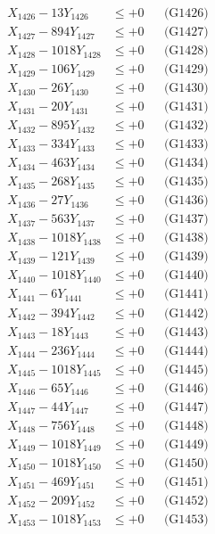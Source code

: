 \documentclass[a4paper,10pt]{article}
\begin{document}
{\begin{align}
X_{1426} - 13Y_{1426} &\leq +0 && \text{(G1426)} \\
X_{1427} - 894Y_{1427} &\leq +0 && \text{(G1427)} \\
X_{1428} - 1018Y_{1428} &\leq +0 && \text{(G1428)} \\
X_{1429} - 106Y_{1429} &\leq +0 && \text{(G1429)} \\
X_{1430} - 26Y_{1430} &\leq +0 && \text{(G1430)} \\
\allowbreak
X_{1431} - 20Y_{1431} &\leq +0 && \text{(G1431)} \\
X_{1432} - 895Y_{1432} &\leq +0 && \text{(G1432)} \\
X_{1433} - 334Y_{1433} &\leq +0 && \text{(G1433)} \\
X_{1434} - 463Y_{1434} &\leq +0 && \text{(G1434)} \\
X_{1435} - 268Y_{1435} &\leq +0 && \text{(G1435)} \\
X_{1436} - 27Y_{1436} &\leq +0 && \text{(G1436)} \\
X_{1437} - 563Y_{1437} &\leq +0 && \text{(G1437)} \\
X_{1438} - 1018Y_{1438} &\leq +0 && \text{(G1438)} \\
X_{1439} - 121Y_{1439} &\leq +0 && \text{(G1439)} \\
X_{1440} - 1018Y_{1440} &\leq +0 && \text{(G1440)} \\
\allowbreak
X_{1441} - 6Y_{1441} &\leq +0 && \text{(G1441)} \\
X_{1442} - 394Y_{1442} &\leq +0 && \text{(G1442)} \\
X_{1443} - 18Y_{1443} &\leq +0 && \text{(G1443)} \\
X_{1444} - 236Y_{1444} &\leq +0 && \text{(G1444)} \\
X_{1445} - 1018Y_{1445} &\leq +0 && \text{(G1445)} \\
X_{1446} - 65Y_{1446} &\leq +0 && \text{(G1446)} \\
X_{1447} - 44Y_{1447} &\leq +0 && \text{(G1447)} \\
X_{1448} - 756Y_{1448} &\leq +0 && \text{(G1448)} \\
X_{1449} - 1018Y_{1449} &\leq +0 && \text{(G1449)} \\
X_{1450} - 1018Y_{1450} &\leq +0 && \text{(G1450)} \\
\allowbreak
X_{1451} - 469Y_{1451} &\leq +0 && \text{(G1451)} \\
X_{1452} - 209Y_{1452} &\leq +0 && \text{(G1452)} \\
X_{1453} - 1018Y_{1453} &\leq +0 && \text{(G1453)} \\

\end{align}}
\end{document}
